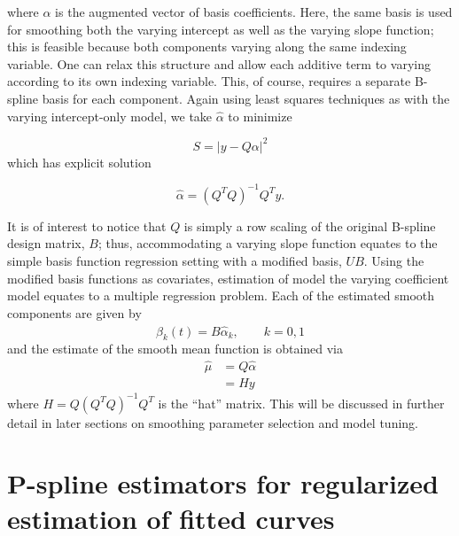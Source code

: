 \documentclass[12pt]{article}
\theoremstyle{definition}
\begin{document}
where $\alpha$ is the augmented vector of basis coefficients. Here, the same basis is used for smoothing both the varying intercept as well as the varying slope function; this is feasible because both components varying along the same indexing variable. One can relax this structure and allow each additive term to varying according to its own indexing variable. This, of course, requires a separate B-spline basis for each component. Again using least squares techniques as with the varying intercept-only model, we take $\hat{\alpha}$ to minimize

\begin{equation} \label{eq:S_varying_intercept_slope_model}
S = \vert y-Q\alpha \vert ^2
\end{equation}
which has explicit solution

\[
\hat{\alpha} =\left(Q^T Q\right)^{-1} Q^Ty.
\]

It is of interest to notice that $Q$ is simply a row scaling of the original B-spline design matrix, $B$; thus, accommodating a varying slope function equates to the simple basis function regression setting with a modified basis, $UB$. Using the modified basis functions as covariates, estimation of model the varying coefficient model equates to a multiple regression problem. Each of the estimated smooth components are given by 
\[
\hat{\beta}_k\left(t \right)= B\hat{\alpha}_k, \qquad k=0,1
\]
\noindent
and the estimate of the smooth mean function is obtained via 
\begin{align*}
\hat{\mu} &= Q\hat{\alpha}\\
&= Hy
\end{align*}
where $H = Q\left(Q^T Q\right)^{-1} Q^T$ is the ``hat'' matrix. This will be discussed in further detail in later sections on smoothing parameter selection and model tuning.










\section{P-spline estimators for regularized estimation of fitted curves}
\end{document}
